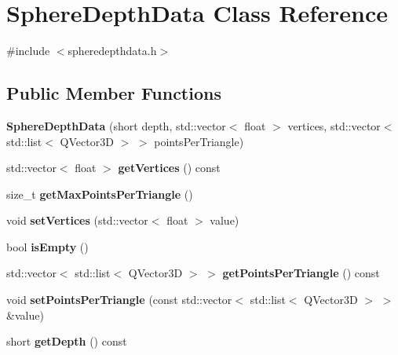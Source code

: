 \hypertarget{class_sphere_depth_data}{}\section{Sphere\+Depth\+Data Class Reference}
\label{class_sphere_depth_data}


{\ttfamily \#include $<$spheredepthdata.\+h$>$}

\subsection*{Public Member Functions}
\begin{DoxyCompactItemize}
\item 
\mbox{\label{class_sphere_depth_data_a746de4be5c4ff2bdcbdc1517aa88a4d9}} 
{\bfseries Sphere\+Depth\+Data} (short depth, std\+::vector$<$ float $>$ vertices, std\+::vector$<$ std\+::list$<$ Q\+Vector3D $>$ $>$ points\+Per\+Triangle)
\item 
\mbox{\label{class_sphere_depth_data_adab658de163c515ec9a41a70300a0af9}} 
std\+::vector$<$ float $>$ {\bfseries get\+Vertices} () const
\item 
\mbox{\label{class_sphere_depth_data_ad151dd50ed037d91aecec6b285a3e342}} 
size\+\_\+t {\bfseries get\+Max\+Points\+Per\+Triangle} ()
\item 
\mbox{\label{class_sphere_depth_data_a95e070bea3d8ec4a0449044e4616208f}} 
void {\bfseries set\+Vertices} (std\+::vector$<$ float $>$ value)
\item 
\mbox{\label{class_sphere_depth_data_a4dbc8b7d0be93277f328a2e241ea336f}} 
bool {\bfseries is\+Empty} ()
\item 
\mbox{\label{class_sphere_depth_data_af42bd1ede7948a735367755a61148adc}} 
std\+::vector$<$ std\+::list$<$ Q\+Vector3D $>$ $>$ {\bfseries get\+Points\+Per\+Triangle} () const
\item 
\mbox{\label{class_sphere_depth_data_ac0d61e109f98ac7c5b7f4ea7381bc963}} 
void {\bfseries set\+Points\+Per\+Triangle} (const std\+::vector$<$ std\+::list$<$ Q\+Vector3D $>$ $>$ \&value)
\item 
\mbox{\label{class_sphere_depth_data_a925a7e0a5486b49151d823471ebe7fe6}} 
short {\bfseries get\+Depth} () const
\end{DoxyCompactItemize}
